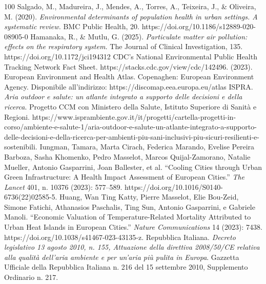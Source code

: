     \begin{thebibliography}{100} %
         Salgado, M., Madureira, J., Mendes, A., Torres, A., Teixeira, J., \& Oliveira, M. (2020). \emph{Environmental determinants of population health in urban settings. A systematic review.} BMC Public Health, 20. https://doi.org/10.1186/s12889-020-08905-0
         Hamanaka, R., \& Mutlu, G. (2025). \emph{Particulate matter air pollution: effects on the respiratory system.} The Journal of Clinical Investigation, 135. https://doi.org/10.1172/jci194312
         CDC’s National Environmental Public Health Tracking Network Fact Sheet. https://stacks.cdc.gov/view/cdc/142496.
         (2023). European Environment and Health Atlas. Copenaghen: European Environment Agency. Disponibile all'indirizzo: https://discomap.eea.europa.eu/atlas
         ISPRA. \emph{Aria outdoor e salute: un atlante integrato a supporto delle decisioni e della ricerca}. Progetto CCM con Ministero della Salute, Istituto Superiore di Sanità e Regioni. https://www.isprambiente.gov.it/it/progetti/cartella-progetti-in-corso/ambiente-e-salute-1/aria-outdoor-e-salute-un-atlante-integrato-a-supporto-delle-decisioni-e-della-ricerca-per-ambienti-piu-sani-inclusivi-piu-sicuri-resilienti-e-sostenibili.
         Iungman, Tamara, Marta Cirach, Federica Marando, Evelise Pereira Barboza, Sasha Khomenko, Pedro Masselot, Marcos Quijal-Zamorano, Natalie Mueller, Antonio Gasparrini, Joan Ballester, et al. ``Cooling Cities through Urban Green Infrastructure: A Health Impact Assessment of European Cities.'' \emph{The Lancet} 401, n. 10376 (2023): 577--589. https://doi.org/10.1016/S0140-6736(22)02585-5.
         Huang, Wan Ting Katty, Pierre Masselot, Elie Bou-Zeid, Simone Fatichi, Athanasios Paschalis, Ting Sun, Antonio Gasparrini, e Gabriele Manoli. ``Economic Valuation of Temperature-Related Mortality Attributed to Urban Heat Islands in European Cities.'' \emph{Nature Communications} 14 (2023): 7438. https://doi.org/10.1038/s41467-023-43135-z.
         Repubblica Italiana. \emph{Decreto legislativo 13 agosto 2010, n. 155, Attuazione della direttiva 2008/50/CE relativa alla qualità dell'aria ambiente e per un'aria più pulita in Europa}. Gazzetta Ufficiale della Repubblica Italiana n. 216 del 15 settembre 2010, Supplemento Ordinario n. 217.

\end{thebibliography}
